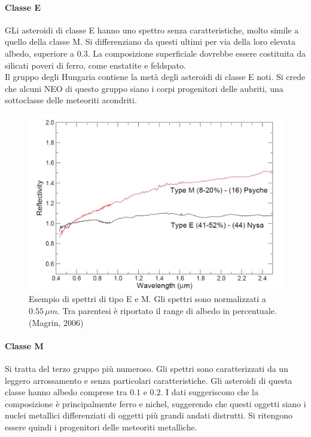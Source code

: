 \documentclass[a4paper,11pt,openright]{book}
\begin{document}
\paragraph*{Classe E}
GLi asteroidi di classe E hanno uno spettro senza caratteristiche, molto simile a quello della classe M. Si differenziano da questi ultimi per via della loro elevata albedo, superiore a $0.3$. La composizione superficiale dovrebbe essere costituita da silicati poveri di ferro, come enstatite e feldspato.\\
Il gruppo degli Hungaria contiene la metà degli asteroidi di classe E noti. Si crede che alcuni NEO di questo gruppo siano i corpi progenitori delle aubriti, una sottoclasse delle meteoriti acondriti.

\begin{figure}
    \centering
    \includegraphics[scale=0.3]{figure/spettro_em.jpg}
    \caption{Esempio di spettri di tipo E e M. Gli spettri sono normalizzati a $0.55\,\mu m$. Tra parentesi è riportato il range di albedo in percentuale. (Magrin, 2006)}
    \label{spettro_em}
\end{figure}

\paragraph*{Classe M}
Si tratta del terzo gruppo più numeroso. Gli spettri sono caratterizzati da un leggero arrossamento e senza particolari caratteristiche. Gli asteroidi di questa classe hanno albedo comprese tra $0.1$ e $0.2$. I dati suggeriscono che la composizione è principalmente ferro e nichel, suggerendo che questi oggetti siano i nuclei metallici differenziati di oggetti più grandi andati distrutti. Si ritengono essere quindi i progenitori delle meteoriti metalliche.
\end{document}
